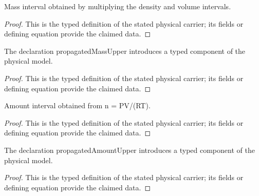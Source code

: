 \begin{definition}
  \label{def:physics:IPhO_2026_4_A_1:aux028}
  Mass interval obtained by multiplying the density and volume intervals.
\end{definition}
\begin{proof}
  This is the typed definition of the stated physical carrier; its fields or defining equation provide the claimed data.
\end{proof}

\begin{definition}
  \label{def:physics:IPhO_2026_4_A_1:aux029}
  The declaration propagatedMassUpper introduces a typed component of the physical model.
\end{definition}
\begin{proof}
  This is the typed definition of the stated physical carrier; its fields or defining equation provide the claimed data.
\end{proof}

\begin{definition}
  \label{def:physics:IPhO_2026_4_A_1:aux030}
  Amount interval obtained from n = PV/(RT).
\end{definition}
\begin{proof}
  This is the typed definition of the stated physical carrier; its fields or defining equation provide the claimed data.
\end{proof}

\begin{definition}
  \label{def:physics:IPhO_2026_4_A_1:aux031}
  The declaration propagatedAmountUpper introduces a typed component of the physical model.
\end{definition}
\begin{proof}
  This is the typed definition of the stated physical carrier; its fields or defining equation provide the claimed data.
\end{proof}

